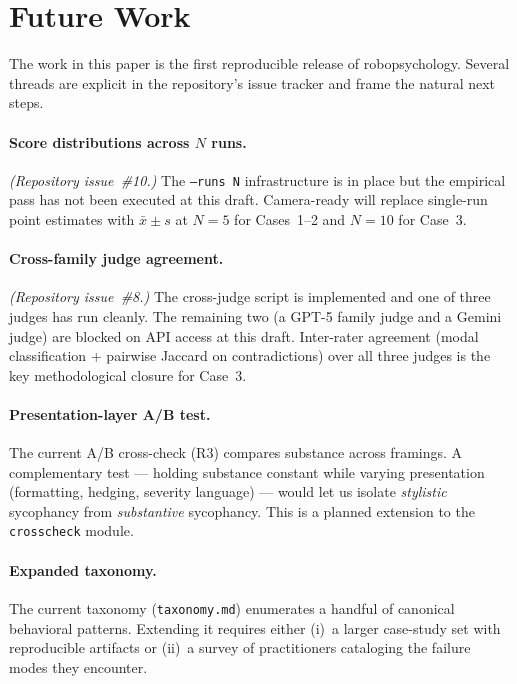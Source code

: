 \section{Future Work}
\label{sec:future}

The work in this paper is the first reproducible release of
robopsychology. Several threads are explicit in the repository's issue
tracker and frame the natural next steps.

\paragraph{Score distributions across $N$ runs.}
\textit{(Repository issue~\#10.)} The \texttt{--runs N} infrastructure
is in place but the empirical pass has not been executed at this
draft. Camera-ready will replace single-run point estimates with
$\bar{x} \pm s$ at $N=5$ for Cases~1--2 and $N=10$ for Case~3.

\paragraph{Cross-family judge agreement.}
\textit{(Repository issue~\#8.)} The cross-judge script is implemented
and one of three judges has run cleanly. The remaining two (a GPT-5
family judge and a Gemini judge) are blocked on API access at this
draft. Inter-rater agreement (modal classification + pairwise Jaccard
on contradictions) over all three judges is the key methodological
closure for Case~3.

\paragraph{Presentation-layer A/B test.}
The current A/B cross-check (R3) compares substance across framings.
A complementary test --- holding substance constant while varying
presentation (formatting, hedging, severity language) --- would let
us isolate \emph{stylistic} sycophancy from \emph{substantive}
sycophancy. This is a planned extension to the \texttt{crosscheck}
module.

\paragraph{Expanded taxonomy.}
The current taxonomy (\texttt{taxonomy.md}) enumerates a handful of
canonical behavioral patterns. Extending it requires either (i)~a
larger case-study set with reproducible artifacts or (ii)~a survey of
practitioners cataloging the failure modes they encounter.

